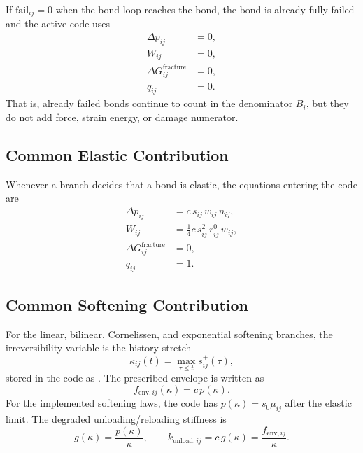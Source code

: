 \documentclass[11pt]{article}
\newcommand{\code}[1]{\texttt{\detokenize{#1}}}
\begin{document}
If \(\mathrm{fail}_{ij}=0\) when the bond loop reaches the bond, the bond is
already fully failed and the active code uses
\begin{align}
    \Delta p_{ij} &= 0, \\
    W_{ij} &= 0, \\
    \Delta G_{ij}^{\mathrm{fracture}} &= 0, \\
    q_{ij} &= 0.
\end{align}
That is, already failed bonds continue to count in the denominator \(B_i\), but
they do not add force, strain energy, or damage numerator.

\subsection{Common Elastic Contribution}

Whenever a branch decides that a bond is elastic, the equations entering the
code are
\begin{align}
    \Delta p_{ij}
    &=
    c\,s_{ij}\,w_{ij}\,n_{ij}, \\
    W_{ij}
    &=
    \frac{1}{4}
    c\,s_{ij}^{2}\,r_{ij}^0\,w_{ij}, \\
    \Delta G_{ij}^{\mathrm{fracture}}
    &=
    0, \\
    q_{ij}
    &=
    1 .
\end{align}

\subsection{Common Softening Contribution}

For the linear, bilinear, Cornelissen, and exponential softening branches, the
irreversibility variable is the history stretch
\begin{equation}
    \kappa_{ij}(t)
    =
    \max_{\tau\le t}s_{ij}^{+}(\tau),
\end{equation}
stored in the code as \code{bond_s_history[i][j]}. The prescribed envelope is
written as
\begin{equation}
    f_{\mathrm{env},ij}(\kappa)
    =
    c\,p(\kappa).
\end{equation}
For the implemented softening laws, the code has
\(p(\kappa)=s_0\mu_{ij}\) after the elastic limit. The degraded
unloading/reloading stiffness is
\begin{equation}
    g(\kappa)=\frac{p(\kappa)}{\kappa},
    \qquad
    k_{\mathrm{unload},ij}
    =
    c\,g(\kappa)
    =
    \frac{f_{\mathrm{env},ij}}{\kappa}.
\end{equation}
\end{document}
